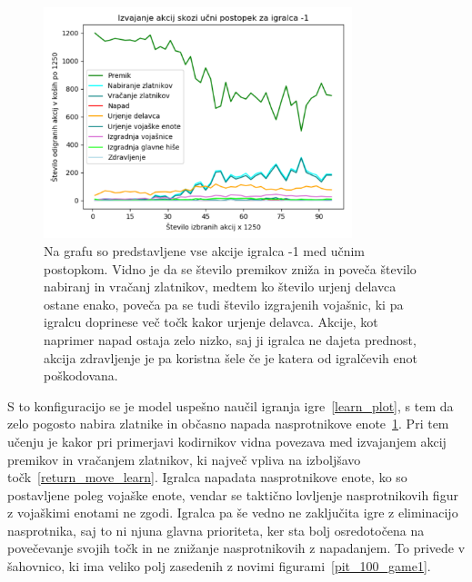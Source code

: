 \documentclass[a4paper, 12pt]{book}
\begin{document}
\begin{figure}[h!]
	\begin{center}
		\includegraphics[width=0.8\textwidth]{photos/all_acts_playerminus1.pdf}
	\end{center}
	\caption{Na grafu so predstavljene vse akcije igralca -1 med učnim postopkom.
		Vidno je da se število premikov zniža in poveča število nabiranj in vračanj zlatnikov, medtem ko število urjenj delavca ostane enako, poveča pa se tudi število izgrajenih vojašnic, ki pa igralcu doprinese več točk kakor urjenje delavca.
		Akcije, kot naprimer napad ostaja zelo nizko, saj ji igralca ne dajeta prednost, akcija zdravljenje je pa koristna šele če je katera od igralčevih enot poškodovana. }
	\label{all_acts_playerminus1}
\end{figure}
S to konfiguracijo se je model uspešno naučil igranja igre~\ref{learn_plot}, s tem da zelo pogosto nabira zlatnike in občasno napada nasprotnikove enote~\ref{all_acts_playerminus1}.
Pri tem učenju je kakor pri primerjavi kodirnikov vidna povezava med izvajanjem akcij premikov in vračanjem zlatnikov, ki največ vpliva na izboljšavo točk~\ref{return_move_learn}.
Igralca napadata nasprotnikove enote, ko so postavljene poleg vojaške enote, vendar se taktično lovljenje nasprotnikovih figur z vojaškimi enotami ne zgodi.
Igralca pa še vedno ne zaključita igre z eliminacijo nasprotnika, saj to ni njuna glavna prioriteta, ker sta bolj osredotočena na povečevanje svojih točk in ne znižanje nasprotnikovih z napadanjem.
To privede v šahovnico, ki ima veliko polj zasedenih z novimi figurami~\ref{pit_100_game1}.
\end{document}
